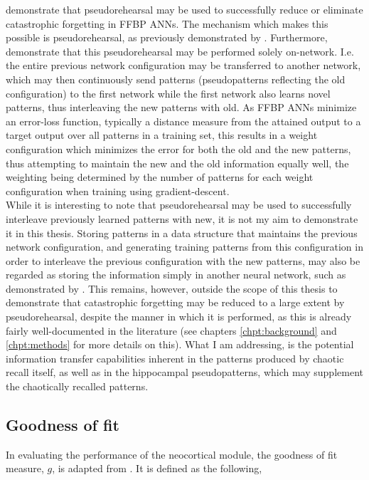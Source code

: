\cite{Ans1997} demonstrate that pseudorehearsal may be used to successfully reduce or eliminate catastrophic forgetting in FFBP ANNs. The mechanism which makes this possible is pseudorehearsal, as previously demonstrated by \cite{Robins1995}. Furthermore, \cite{Ans1997} demonstrate that this pseudorehearsal may be performed solely on-network. I.e. the entire previous network configuration may be transferred to another network, which may then continuously send patterns (pseudopatterns reflecting the old configuration) to the first network while the first network also learns novel patterns, thus interleaving the new patterns with old. As FFBP ANNs minimize an error-loss function, typically a distance measure from the attained output to a target output over all patterns in a training set, this results in a weight configuration which minimizes the error for both the old and the new patterns, thus attempting to maintain the new and the old information equally well, the weighting being determined by the number of patterns for each weight configuration when training using gradient-descent.
\\

While it is interesting to note that pseudorehearsal may be used to successfully interleave previously learned patterns with new, it is not my aim to demonstrate it in this thesis.
Storing patterns in a data structure that maintains the previous network configuration, and generating training patterns from this configuration in order to interleave the previous configuration with the new patterns, may also be regarded as storing the information simply in another neural network, such as demonstrated by \cite{French1997}. This remains, however, outside the scope of this thesis to demonstrate that catastrophic forgetting may be reduced to a large extent by pseudorehearsal, despite the manner in which it is performed, as this is already fairly well-documented in the literature (see chapters \ref{chpt:background} and \ref{chpt:methods} for more details on this). 
What I am addressing, is the potential information transfer capabilities inherent in the patterns produced by chaotic recall itself, as well as in the hippocampal pseudopatterns, which may supplement the chaotically recalled patterns.

\subsection{Goodness of fit}

In evaluating the performance of the neocortical module, the goodness of fit measure, $g$, is adapted from \citep{Hattori2010, Hattori2014}. It is defined as the following,

